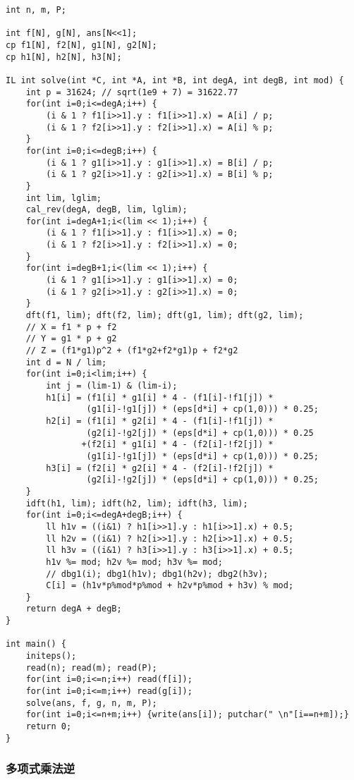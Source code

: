 \documentclass[UTF8]{ctexart}
\begin{document}
\begin{framed}
\begin{lstlisting}
int n, m, P;

int f[N], g[N], ans[N<<1];
cp f1[N], f2[N], g1[N], g2[N];
cp h1[N], h2[N], h3[N];

IL int solve(int *C, int *A, int *B, int degA, int degB, int mod) {
    int p = 31624; // sqrt(1e9 + 7) = 31622.77
    for(int i=0;i<=degA;i++) { 
        (i & 1 ? f1[i>>1].y : f1[i>>1].x) = A[i] / p; 
        (i & 1 ? f2[i>>1].y : f2[i>>1].x) = A[i] % p;
    }
    for(int i=0;i<=degB;i++) { 
        (i & 1 ? g1[i>>1].y : g1[i>>1].x) = B[i] / p; 
        (i & 1 ? g2[i>>1].y : g2[i>>1].x) = B[i] % p;
    }
    int lim, lglim;
    cal_rev(degA, degB, lim, lglim);
    for(int i=degA+1;i<(lim << 1);i++) {
        (i & 1 ? f1[i>>1].y : f1[i>>1].x) = 0; 
        (i & 1 ? f2[i>>1].y : f2[i>>1].x) = 0;
    }
    for(int i=degB+1;i<(lim << 1);i++) {
        (i & 1 ? g1[i>>1].y : g1[i>>1].x) = 0; 
        (i & 1 ? g2[i>>1].y : g2[i>>1].x) = 0;
    }
    dft(f1, lim); dft(f2, lim); dft(g1, lim); dft(g2, lim);
    // X = f1 * p + f2
    // Y = g1 * p + g2
    // Z = (f1*g1)p^2 + (f1*g2+f2*g1)p + f2*g2
    int d = N / lim;
    for(int i=0;i<lim;i++) {
        int j = (lim-1) & (lim-i);
        h1[i] = (f1[i] * g1[i] * 4 - (f1[i]-!f1[j]) * 
                (g1[i]-!g1[j]) * (eps[d*i] + cp(1,0))) * 0.25;
        h2[i] = (f1[i] * g2[i] * 4 - (f1[i]-!f1[j]) * 
                (g2[i]-!g2[j]) * (eps[d*i] + cp(1,0))) * 0.25
               +(f2[i] * g1[i] * 4 - (f2[i]-!f2[j]) *
                (g1[i]-!g1[j]) * (eps[d*i] + cp(1,0))) * 0.25;
        h3[i] = (f2[i] * g2[i] * 4 - (f2[i]-!f2[j]) *
                (g2[i]-!g2[j]) * (eps[d*i] + cp(1,0))) * 0.25;
    }
    idft(h1, lim); idft(h2, lim); idft(h3, lim);
    for(int i=0;i<=degA+degB;i++) {
        ll h1v = ((i&1) ? h1[i>>1].y : h1[i>>1].x) + 0.5;
        ll h2v = ((i&1) ? h2[i>>1].y : h2[i>>1].x) + 0.5;
        ll h3v = ((i&1) ? h3[i>>1].y : h3[i>>1].x) + 0.5;
        h1v %= mod; h2v %= mod; h3v %= mod;
        // dbg1(i); dbg1(h1v); dbg1(h2v); dbg2(h3v);
        C[i] = (h1v*p%mod*p%mod + h2v*p%mod + h3v) % mod;
    }
    return degA + degB;
}

int main() {
    initeps();
    read(n); read(m); read(P);
    for(int i=0;i<=n;i++) read(f[i]);
    for(int i=0;i<=m;i++) read(g[i]);
    solve(ans, f, g, n, m, P);
    for(int i=0;i<=n+m;i++) {write(ans[i]); putchar(" \n"[i==n+m]);}
    return 0;
}
\end{lstlisting}
\end{framed}

\subsubsection{多项式乘法逆}
\end{document}
